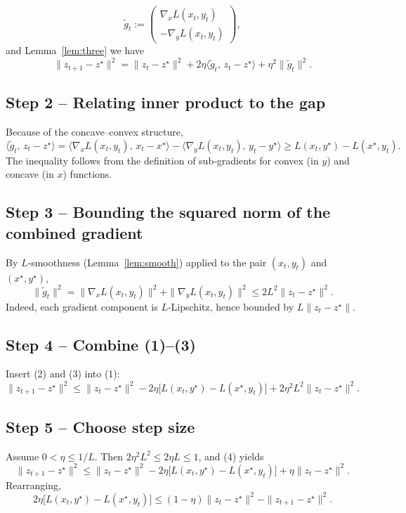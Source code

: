 \documentclass{article}
\begin{document}
\[
\tilde g_{t}:=
\begin{pmatrix}
\nabla_{x}L(x_{t},y_{t})\\[2pt]
-\nabla_{y}L(x_{t},y_{t})
\end{pmatrix},
\]
and Lemma~\ref{lem:three} we have
\[
\|z_{t+1}-z^{\star}\|^{2}
= \|z_{t}-z^{\star}\|^{2}
+2\eta\langle \tilde g_{t},\,z_{t}-z^{\star}\rangle
+\eta^{2}\|\tilde g_{t}\|^{2}. \tag{1}
\]

\subsection*{Step 2 – Relating inner product to the gap}
Because of the concave–convex structure,
\[
\langle \tilde g_{t},\,z_{t}-z^{\star}\rangle
= \langle \nabla_{x}L(x_{t},y_{t}),\,x_{t}-x^{\star}\rangle
-\langle \nabla_{y}L(x_{t},y_{t}),\,y_{t}-y^{\star}\rangle
\ge L(x_{t},y^{\star})-L(x^{\star},y_{t}). \tag{2}
\]
The inequality follows from the definition of sub‑gradients for convex (in $y$) and concave (in $x$) functions.

\subsection*{Step 3 – Bounding the squared norm of the combined gradient}
By $L$‑smoothness (Lemma~\ref{lem:smooth}) applied to the pair $(x_{t},y_{t})$ and $(x^{\star},y^{\star})$,
\[
\|\tilde g_{t}\|^{2}
= \|\nabla_{x}L(x_{t},y_{t})\|^{2}
+\|\nabla_{y}L(x_{t},y_{t})\|^{2}
\le 2L^{2}\|z_{t}-z^{\star}\|^{2}. \tag{3}
\]
Indeed, each gradient component is $L$‑Lipschitz, hence bounded by $L\|z_{t}-z^{\star}\|$.

\subsection*{Step 4 – Combine (1)–(3)}
Insert (2) and (3) into (1):
\[
\|z_{t+1}-z^{\star}\|^{2}
\le \|z_{t}-z^{\star}\|^{2}
-2\eta\bigl[L(x_{t},y^{\star})-L(x^{\star},y_{t})\bigr]
+2\eta^{2}L^{2}\|z_{t}-z^{\star}\|^{2}. \tag{4}
\]

\subsection*{Step 5 – Choose step size}
Assume $0<\eta\le 1/L$. Then $2\eta^{2}L^{2}\le 2\eta L\le 1$, and (4) yields
\[
\|z_{t+1}-z^{\star}\|^{2}
\le \|z_{t}-z^{\star}\|^{2}
-2\eta\bigl[L(x_{t},y^{\star})-L(x^{\star},y_{t})\bigr]
+\eta\|z_{t}-z^{\star}\|^{2}. \tag{5}
\]
Rearranging,
\[
2\eta\bigl[L(x_{t},y^{\star})-L(x^{\star},y_{t})\bigr]
\le (1-\eta)\|z_{t}-z^{\star}\|^{2}-\|z_{t+1}-z^{\star}\|^{2}. \tag{6}
\]
\end{document}
